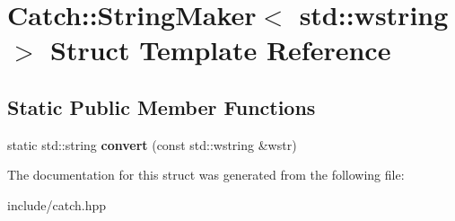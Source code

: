 \hypertarget{structCatch_1_1StringMaker_3_01std_1_1wstring_01_4}{}\section{Catch\+:\+:String\+Maker$<$ std\+:\+:wstring $>$ Struct Template Reference}
\label{structCatch_1_1StringMaker_3_01std_1_1wstring_01_4}
\subsection*{Static Public Member Functions}
\begin{DoxyCompactItemize}
\item 
static std\+::string {\bfseries convert} (const std\+::wstring \&wstr)\hypertarget{structCatch_1_1StringMaker_3_01std_1_1wstring_01_4_a375d49d6281bee4d36d853fa1bd5ebbd}{}\label{structCatch_1_1StringMaker_3_01std_1_1wstring_01_4_a375d49d6281bee4d36d853fa1bd5ebbd}

\end{DoxyCompactItemize}


The documentation for this struct was generated from the following file\+:\begin{DoxyCompactItemize}
\item 
include/catch.\+hpp\end{DoxyCompactItemize}
